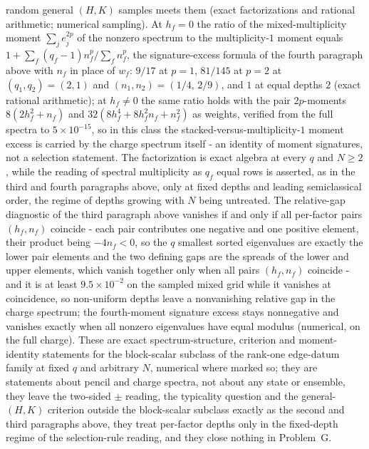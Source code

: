 random general \((H,K)\) samples meets them (exact factorizations and rational arithmetic; numerical sampling). At \(h_f=0\) the ratio of the mixed-multiplicity moment \(\sum_j e_j^{2p}\) of the nonzero spectrum to the multiplicity-\(1\) moment equals \(1+\sum_f(q_f-1)n_f^{p}/\sum_f n_f^{p}\), the signature-excess formula of the fourth paragraph above with \(n_f\) in place of \(w_f\): \(9/17\) at \(p=1\), \(81/145\) at \(p=2\) at \((q_1,q_2)=(2,1)\) and \((n_1,n_2)=(1/4,\,2/9)\), and \(1\) at equal depths \(2\) (exact rational arithmetic); at \(h_f\ne0\) the same ratio holds with the pair \(2p\)-moments \(8(2h_f^{2}+n_f)\) and \(32(8h_f^{4}+8h_f^{2}n_f+n_f^{2})\) as weights, verified from the full spectra to \(5\times10^{-15}\), so in this class the stacked-versus-multiplicity-\(1\) moment excess is carried by the charge spectrum itself - an identity of moment signatures, not a selection statement. The factorization is exact algebra at every \(q\) and \(N\ge2\), while the reading of spectral multiplicity as \(q_f\) equal rows is asserted, as in the third and fourth paragraphs above, only at fixed depths and leading semiclassical order, the regime of depths growing with \(N\) being untreated. The relative-gap diagnostic of the third paragraph above vanishes if and only if all per-factor pairs \((h_f,n_f)\) coincide - each pair contributes one negative and one positive element, their product being \(-4n_f<0\), so the \(q\) smallest sorted eigenvalues are exactly the lower pair elements and the two defining gaps are the spreads of the lower and upper elements, which vanish together only when all pairs \((h_f,n_f)\) coincide - and it is at least \(9.5\times10^{-2}\) on the sampled mixed grid while it vanishes at coincidence, so non-uniform depths leave a nonvanishing relative gap in the charge spectrum; the fourth-moment signature excess stays nonnegative and vanishes exactly when all nonzero eigenvalues have equal modulus (numerical, on the full charge). These are exact spectrum-structure, criterion and moment-identity statements for the block-scalar subclass of the rank-one edge-datum family at fixed \(q\) and arbitrary \(N\), numerical where marked so; they are statements about pencil and charge spectra, not about any state or ensemble, they leave the two-sided \(\pm\) reading, the typicality question and the general-\((H,K)\) criterion outside the block-scalar subclass exactly as the second and third paragraphs above, they treat per-factor depths only in the fixed-depth regime of the selection-rule reading, and they close nothing in Problem~G.

